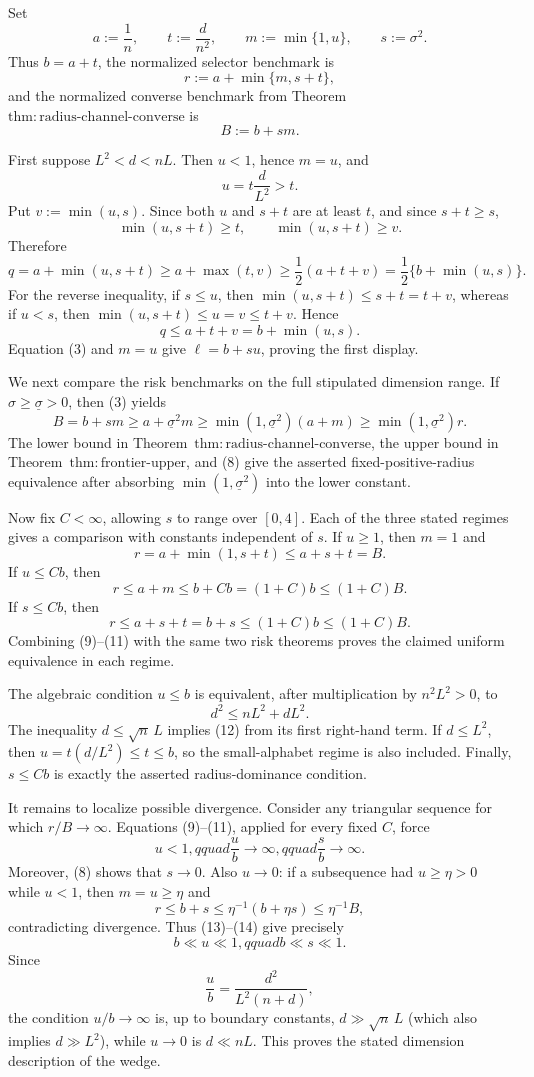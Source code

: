 Set
\[
 a:=\frac1n,\qquad t:=\frac d{n^2},\qquad
 m:=\min\{1,u\},\qquad s:=\sigma^2.
\tag{1}
\]
Thus \(b=a+t\), the normalized selector benchmark is
\[
 r:=a+\min\{m,s+t\},
\tag{2}
\]
and the normalized converse benchmark from Theorem~\(\mathrm{thm:radius\text{-}channel\text{-}converse}\) is
\[
 B:=b+sm.
\tag{3}
\]

First suppose \(L^2<d<nL\).  Then \(u<1\), hence \(m=u\), and
\[
 u=t\frac d{L^2}>t.
\tag{4}
\]
Put \(v:=\min(u,s)\).  Since both \(u\) and \(s+t\) are at least \(t\), and since \(s+t\ge s\),
\[
 \min(u,s+t)\ge t,
 \qquad
 \min(u,s+t)\ge v.
\tag{5}
\]
Therefore
\[
 q=a+\min(u,s+t)
 \ge a+\max(t,v)
 \ge \frac12(a+t+v)
 =\frac12\{b+\min(u,s)\}.
\tag{6}
\]
For the reverse inequality, if \(s\le u\), then \(\min(u,s+t)\le s+t=t+v\), whereas if \(u<s\), then \(\min(u,s+t)\le u=v\le t+v\).  Hence
\[
 q\le a+t+v=b+\min(u,s).
\tag{7}
\]
Equation (3) and \(m=u\) give \(\ell=b+su\), proving the first display.

We next compare the risk benchmarks on the full stipulated dimension range.  If \(\sigma\ge\underline\sigma>0\), then (3) yields
\[
 B=b+sm\ge a+\underline\sigma^2m
 \ge \min(1,\underline\sigma^2)(a+m)
 \ge \min(1,\underline\sigma^2)r.
\tag{8}
\]
The lower bound in Theorem~\(\mathrm{thm:radius\text{-}channel\text{-}converse}\), the upper bound in Theorem~\(\mathrm{thm:frontier\text{-}upper}\), and (8) give the asserted fixed-positive-radius equivalence after absorbing \(\min(1,\underline\sigma^2)\) into the lower constant.

Now fix \(C<\infty\), allowing \(s\) to range over \([0,4]\).  Each of the three stated regimes gives a comparison with constants independent of \(s\).  If \(u\ge1\), then \(m=1\) and
\[
 r=a+\min(1,s+t)\le a+s+t=B.
\tag{9}
\]
If \(u\le Cb\), then
\[
 r\le a+m\le b+Cb=(1+C)b\le(1+C)B.
\tag{10}
\]
If \(s\le Cb\), then
\[
 r\le a+s+t=b+s\le(1+C)b\le(1+C)B.
\tag{11}
\]
Combining (9)--(11) with the same two risk theorems proves the claimed uniform equivalence in each regime.

The algebraic condition \(u\le b\) is equivalent, after multiplication by \(n^2L^2>0\), to
\[
 d^2\le nL^2+dL^2.
\tag{12}
\]
The inequality \(d\le\sqrt n\,L\) implies (12) from its first right-hand term.  If \(d\le L^2\), then \(u=t(d/L^2)\le t\le b\), so the small-alphabet regime is also included.  Finally, \(s\le Cb\) is exactly the asserted radius-dominance condition.

It remains to localize possible divergence.  Consider any triangular sequence for which \(r/B\to\infty\).  Equations (9)--(11), applied for every fixed \(C\), force
\[
 u<1,qquad \frac ub\longrightarrow\infty,qquad
 \frac sb\longrightarrow\infty.
\tag{13}
\]
Moreover, (8) shows that \(s\to0\).  Also \(u\to0\): if a subsequence had \(u\ge\eta>0\) while \(u<1\), then \(m=u\ge\eta\) and
\[
 r\le b+s\le \eta^{-1}(b+\eta s)\le\eta^{-1}B,
\tag{14}
\]
contradicting divergence.  Thus (13)--(14) give precisely
\[
 b\ll u\ll1,qquad b\ll s\ll1.
\tag{15}
\]
Since
\[
 \frac ub=\frac{d^2}{L^2(n+d)},
\tag{16}
\]
the condition \(u/b\to\infty\) is, up to boundary constants, \(d\gg\sqrt n\,L\) (which also implies \(d\gg L^2\)), while \(u\to0\) is \(d\ll nL\).  This proves the stated dimension description of the wedge.

